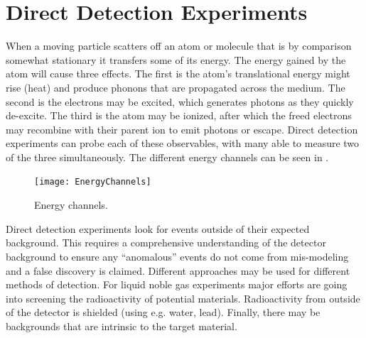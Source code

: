 











\section[Direct Detection Experiments][Direct Detection Experiments]{Direct Detection Experiments}
\label{sec:direct_detect}
When a moving particle scatters off an atom or molecule that is by comparison somewhat stationary it transfers some of its
energy.  The energy gained by the atom will cause three effects.  The first is the atom's translational energy might rise (heat) and
produce phonons that are propagated across the medium.  The second is the electrons may be excited, which generates photons
as they quickly de-excite.  The third is the atom may be ionized, after which the freed electrons may recombine with their parent ion
to emit photons or escape.  Direct detection experiments can probe each of these observables, with many able to measure two of the three
simultaneously.  The different energy channels can be seen in .

\begin{figure}
\centering
\texttt{[image: EnergyChannels]}
\caption{Energy channels.}
\label{fig:energy_channels}
\end{figure}
 
Direct detection experiments look for events outside of their expected background.  This requires a comprehensive
understanding of the detector background to ensure any ``anomalous'' events do not come from mis-modeling and a false discovery is
claimed.  Different approaches may be
used for different methods of detection.  For liquid noble gas experiments major efforts are going into screening the radioactivity of
potential materials.  Radioactivity from outside of the detector is shielded (using e.g. water, lead).  Finally, there may be backgrounds
that are intrinsic to the target material.

